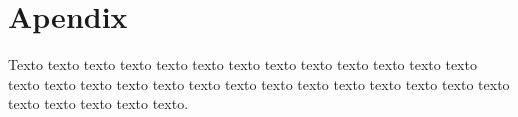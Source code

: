 \chapter{Apendix}
\label{cap:Apendix}

Texto texto texto texto texto texto texto texto texto texto texto texto texto
texto texto texto texto texto texto texto texto texto texto texto texto texto
texto texto texto texto texto texto.

